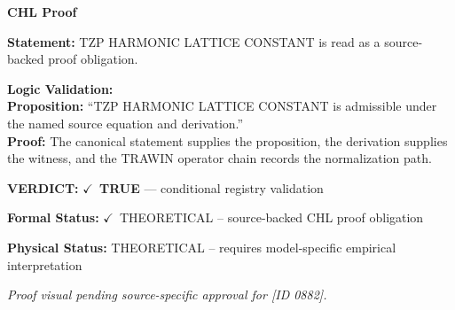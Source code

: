 \vspace{0.45em}
\noindent\textbf{CHL Proof}\par
\textbf{Statement:} TZP HARMONIC LATTICE CONSTANT is read as a source-backed proof obligation.

\textbf{Logic Validation:}\\
\textbf{Proposition:} ``TZP HARMONIC LATTICE CONSTANT is admissible under the named source equation and derivation.''\\
\textbf{Proof:} The canonical statement supplies the proposition, the derivation supplies the witness, and the TRAWIN operator chain records the normalization path.

\textbf{VERDICT:} \ensuremath{\checkmark}\ \textbf{TRUE} --- conditional registry validation

\textbf{Formal Status:} \ensuremath{\checkmark}\ THEORETICAL -- source-backed CHL proof obligation

\textbf{Physical Status:} THEORETICAL -- requires model-specific empirical interpretation
\par\vspace{0.45em}
\par
\vfill
\begingroup\footnotesize\itshape
Proof visual pending source-specific approval for [ID 0882].
\par\endgroup
\vfill
\endgroup
\endgroup
